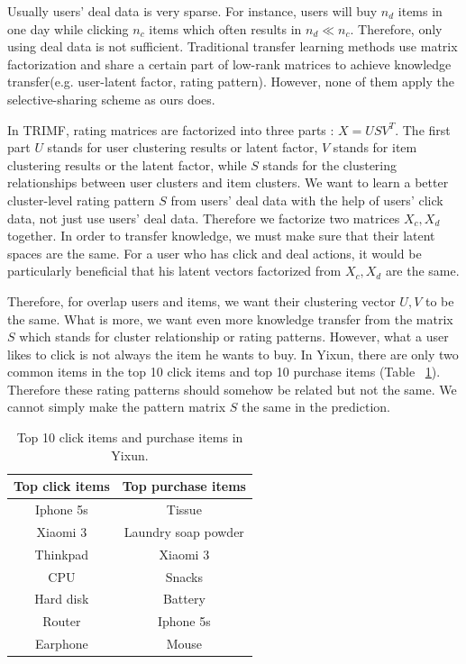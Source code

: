 Usually users' deal data is very sparse. For instance, users will buy $n_d$ items in one day while clicking $n_c$ items which often results in $n_d \ll n_c$. Therefore, only using deal data is not sufficient. Traditional transfer learning methods use matrix factorization and share a certain part of low-rank matrices to achieve knowledge transfer(e.g. user-latent factor, rating pattern). However, none of them apply the selective-sharing scheme as ours does.

In TRIMF, rating matrices are factorized into three parts : $X = USV^T$. The first part $U$ stands for user clustering results or latent factor, $V$ stands for item clustering results or the latent factor, while $S$ stands for the clustering relationships between user clusters and item clusters. We want to learn a better cluster-level rating pattern $S$ from users' deal data with the help of users' click data, not just use users' deal data. Therefore we factorize two matrices $X_c, X_d$ together. In order to transfer knowledge, we must make sure that their latent spaces are the same. For a user who has click and deal actions, it would be particularly beneficial that his latent vectors factorized from $X_c, X_d$ are the same.

Therefore, for overlap users and items, we want their clustering vector  $U,V$ to be the same. What is more, we want even more knowledge transfer from the matrix $S$ which stands for cluster relationship or rating patterns. However, what a user likes to click is not always the item he wants to buy. In Yixun, there are only two common items in the top 10 click items and top 10 purchase items (Table ~\ref{tbl:topitem}). Therefore these rating patterns should somehow be related but not the same. We cannot simply make the pattern matrix $S$ the same in the prediction. 

\begin{table}[h]

\label{tbl:topitem}
\begin{center}
\begin{tabular}{| c | c |}
\hline
Top click items & Top purchase items \\
\hline
Iphone 5s & Tissue\\
Xiaomi 3 & Laundry soap powder\\
Thinkpad & Xiaomi 3\\
CPU & Snacks\\
Hard disk & Battery\\
Router & Iphone 5s\\
Earphone & Mouse\\
\hline
\end{tabular}
\caption{Top 10 click items and purchase items in Yixun.}
\end{center}
\end{table}

